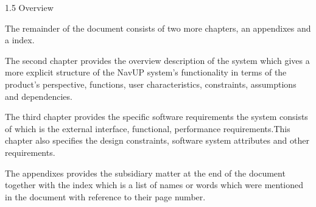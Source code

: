 1.5	Overview 

The remainder of the document consists of two more chapters, an appendixes and a index.

The second chapter provides the overview description of the system which gives a more explicit structure of the NavUP system's functionality in terms of the product's perspective, functions, user characteristics, constraints, assumptions and dependencies.

The third chapter provides the specific software requirements the system consists of which is the external interface, functional, performance requirements.This chapter also specifies the design constraints, software system attributes and other requirements.

The appendixes provides the subsidiary matter at the end of the document together with the index which is a list of names or words which were mentioned in the document with reference to their page number.
